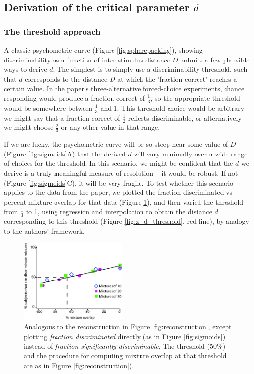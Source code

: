 \documentclass[letterpaper,twocolumn,10pt]{article}
\begin{document}
\subsection{Derivation of the critical parameter $d$} 
\label{sec:derivation}

\subsubsection{The threshold approach} 

A classic psychometric curve (Figure \ref{fig:spherepacking}), showing discriminability as a function of inter-stimulus distance $D$, admits a few plausible ways to derive $d$. 
The simplest is to simply use a discriminability threshold, such that $d$ corresponds to the distance $D$ at which the 'fraction correct' reaches a certain value.  
In the paper's three-alternative forced-choice experiments, chance responding would produce a fraction correct of $\frac{1}{3}$, 
so the appropriate threshold would be somewhere between $\frac{1}{3}$ and 1.  
This threshold choice would be arbitrary -- we might say that a fraction correct of $\frac{1}{2}$ reflects discriminable, 
or alternatively we might choose $\frac{2}{3}$ or any other value in that range.  

If we are lucky, the psychometric curve will be so steep near some value of $D$ (Figure \ref{fig:sigmoids}A) that the derived $d$ will vary minimally over a wide range of choices for the threshold.  
In this scenario, we might be confident that the $d$ we derive is a truly meaningful measure of resolution -- it would be robust.  
If not (Figure \ref{fig:sigmoids}C), it will be very fragile.  
To test whether this scenario applies to the data from the paper, we plotted the fraction discriminated vs percent mixture overlap for that data (Figure \ref{fig:hardthresh}), and then  
varied the threshold from $\frac{1}{3}$ to 1, 
using regression and interpolation to obtain the distance $d$ corresponding to this threshold (Figure \ref{fig:z_d_threshold}, red line), 
by analogy to the authors' framework.  

\begin{figure}[!hbt]
    \centering
    \includegraphics[width=0.475\textwidth]{figures/Fig6_HardThresh}
    \caption{
Analogous to the reconstruction in Figure \ref{fig:reconstruction}, except plotting \textit{fraction discriminated} directly (as in Figure \ref{fig:sigmoids}), instead of \textit{fraction significantly discriminable}. The threshold ($50\%$) and the procedure for computing mixture overlap at that threshold are as in Figure \ref{fig:reconstruction}).}
    \label{fig:hardthresh}
\end{figure} 
\end{document}
